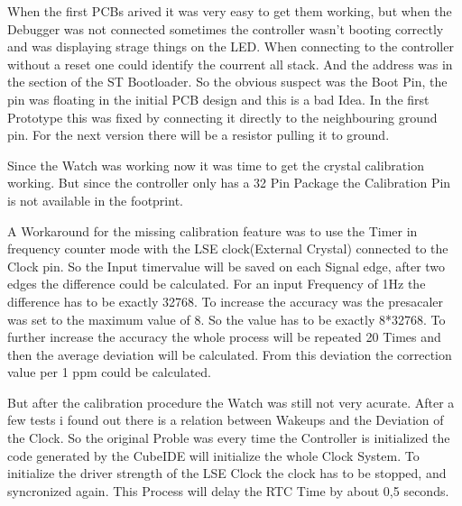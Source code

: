 When the first PCBs arived it was very easy to get them working, but when the Debugger was not connected sometimes the controller wasn't booting correctly and was displaying strage things on the LED. When connecting to the controller without a reset one could identify the courrent all stack. And the address was in the section of the ST Bootloader. So the obvious suspect was the Boot Pin, the pin was floating in the initial PCB design and this is a bad Idea. In the first Prototype this was fixed by connecting it directly to the neighbouring ground pin. For the next version there will be a resistor pulling it to ground.

Since the Watch was working now it was time to get the crystal calibration working. But since the controller only has a 32 Pin Package the Calibration Pin is not available in the footprint. 

A Workaround for the missing calibration feature was to use the Timer in frequency counter mode with the LSE clock(External Crystal) connected to the Clock pin. So the Input timervalue will be saved on each Signal edge, after two edges the difference could be calculated. For an input Frequency of 1Hz the difference has to be exactly 32768. To increase the accuracy was the presacaler was set to the maximum value of 8. So the value has to be exactly 8*32768. To further increase the accuracy the whole process will be repeated 20 Times and then the average deviation will be calculated. From this deviation the correction value per 1 ppm could be calculated.

But after the calibration procedure the Watch was still not very acurate.
After a few tests i found out there is a relation between Wakeups and the Deviation of the Clock. So the original Proble was every time the Controller is initialized the code generated by the CubeIDE will initialize the whole Clock System. To initialize the driver strength of the LSE Clock the clock has to be stopped, and syncronized again. This Process will delay the RTC Time by about 0,5 seconds.


